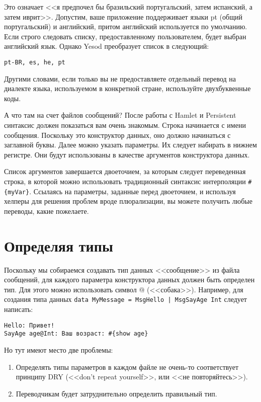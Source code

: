 Это означает <<я предпочел бы бразильский португальский, затем испанский, а затем иврит>>. Допустим, ваше приложение поддерживает языки pt (общий португальский) и английский, притом английский используется по умолчанию. Если строго следовать списку, предоставленному пользователем, будет выбран английский язык. Однако Yesod преобразует список в следующий:

\begin{lstlisting}
pt-BR, es, he, pt
\end{lstlisting}

Другими словами, если только вы не предоставляете отдельный перевод на диалекте языка, используемом в конкретной стране, используйте двухбуквенные коды. %

А что там на счет файлов сообщений? После работы с Hamlet и Persistent синтаксис должен показаться вам очень знакомым. Строка начинается с имени сообщения. Поскольку это конструктор данных, оно должно начинаться с заглавной буквы. Далее можно указать параметры. Их следует набирать в нижнем регистре. Они будут использованы в качестве аргументов конструктора данных.

Список аргументов завершается двоеточием, за которым следует переведенная строка, в которой можно использовать традиционный синтаксис интерполяции \lstinline'#{myVar}'. Ссылаясь на параметры, заданные перед двоеточием, и используя хелперы для решения проблем вроде плюрализации, вы можете получить любые переводы, какие пожелаете.

\section{Определяя типы} %

Поскольку мы собираемся создавать тип данных <<сообщение>> из файла сообщений, для каждого параметра конструктора данных должен быть определен тип. Для этого можно использовать символ @ (<<собака>>). Например, для создания типа данных \lstinline'data MyMessage = MsgHello | MsgSayAge Int' следует написать:

\begin{lstlisting}
Hello: Привет!
SayAge age@Int: Ваш возраст: #{show age}
\end{lstlisting}

Но тут имеют место две проблемы:

\begin{enumerate}
  \item Определять типы параметров в каждом файле не очень-то соответствует принципу DRY (<<don't repeat yourself>>, или <<не повторяйтесь>>).
  \item Переводчикам будет затруднительно определить правильный тип.
\end{enumerate}

